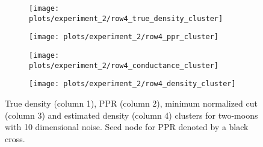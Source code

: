 \documentclass[twoside,11pt]{article}
\newcommand{\1}{\mathbf{1}}
\begin{document}
\begin{figure}
	\centering
	\begin{adjustbox}{minipage=\linewidth,scale=0.8}
		\begin{subfigure}{.24\linewidth}
			\texttt{[image: plots/experiment\_2/row4\_true\_density\_cluster]}
			\caption{}
		\end{subfigure}
		\begin{subfigure}{.24\linewidth}
			\texttt{[image: plots/experiment\_2/row4\_ppr\_cluster]}
			\caption{}
		\end{subfigure}
		\begin{subfigure}{.24\linewidth}
			\texttt{[image: plots/experiment\_2/row4\_conductance\_cluster]}
			\caption{}
		\end{subfigure}
		\begin{subfigure}{.24\linewidth}
			\texttt{[image: plots/experiment\_2/row4\_density\_cluster]}
			\caption{}
		\end{subfigure}
		\caption{\small True density (column 1), PPR (column 2), minimum normalized
			cut (column 3) and estimated density (column 4) clusters for two-moons with 10 dimensional noise. Seed node for PPR denoted by a black cross.} 
		\label{fig:moons_hd}
	\end{adjustbox}
\end{figure}

\newpage

 
\end{document}
